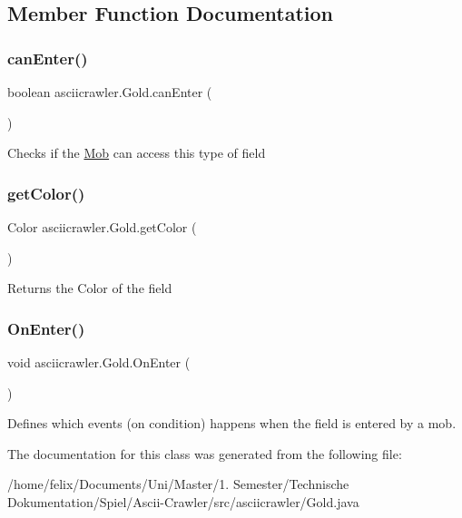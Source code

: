 \subsection{Member Function Documentation}
\mbox{\label{classasciicrawler_1_1Gold_a383c92b41ae941567353150c3fc5c9b3}} 
\subsubsection{\texorpdfstring{can\+Enter()}{canEnter()}}
{\footnotesize\ttfamily boolean asciicrawler.\+Gold.\+can\+Enter (\begin{DoxyParamCaption}{ }\end{DoxyParamCaption})\hspace{0.3cm}{\ttfamily [inline]}}

Checks if the \hyperlink{classasciicrawler_1_1Mob}{Mob} can access this type of field \mbox{\label{classasciicrawler_1_1Gold_a52713aa4b67ea23f2b729bb17034eb9e}} 
\subsubsection{\texorpdfstring{get\+Color()}{getColor()}}
{\footnotesize\ttfamily Color asciicrawler.\+Gold.\+get\+Color (\begin{DoxyParamCaption}{ }\end{DoxyParamCaption})\hspace{0.3cm}{\ttfamily [inline]}}

Returns the Color of the field \mbox{\label{classasciicrawler_1_1Gold_a663ee19ca7e6f0b0b518bd977df8b97b}} 
\subsubsection{\texorpdfstring{On\+Enter()}{OnEnter()}}
{\footnotesize\ttfamily void asciicrawler.\+Gold.\+On\+Enter (\begin{DoxyParamCaption}{ }\end{DoxyParamCaption})\hspace{0.3cm}{\ttfamily [inline]}}

Defines which events (on condition) happens when the field is entered by a mob. 

The documentation for this class was generated from the following file\+:\begin{DoxyCompactItemize}
\item 
/home/felix/\+Documents/\+Uni/\+Master/1. Semester/\+Technische Dokumentation/\+Spiel/\+Ascii-\/\+Crawler/src/asciicrawler/Gold.\+java\end{DoxyCompactItemize}
